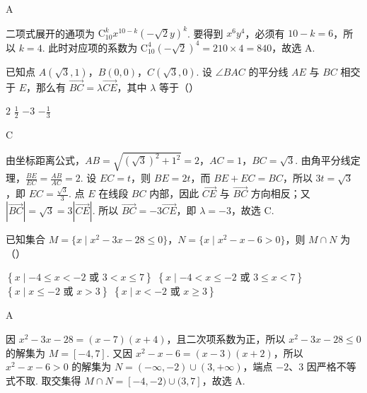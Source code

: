 \begin{answer}A\end{answer}

\begin{solution}
二项式展开的通项为 \(\mathrm C_{10}^{k}x^{10-k}\left(-\sqrt{2}y\right)^{k}\). 要得到 \(x^{6}y^{4}\)，必须有 \(10-k=6\)，所以 \(k=4\). 此时对应项的系数为 \(\mathrm C_{10}^{4}\left(-\sqrt{2}\right)^{4}=210\times4=840\)，故选 A.
\end{solution}

\begin{problem}
已知点 \(A(\sqrt{3}, 1)\)，\(B(0, 0)\)，\(C(\sqrt{3}, 0)\). 设 \(\angle BAC\) 的平分线 \(AE\) 与 \(BC\) 相交于 \(E\)，那么有 \(\overrightarrow{BC} = \lambda \overrightarrow{CE}\)，其中 \(\lambda\) 等于（\quad）

\choices
    {\(2\)}
    {\(\frac{1}{2}\)}
    {\(-3\)}
    {\(-\frac{1}{3}\)}
\end{problem}

\begin{answer}C\end{answer}

\begin{solution}
由坐标距离公式，\(AB=\sqrt{(\sqrt3)^{2}+1^{2}}=2\)，\(AC=1\)，\(BC=\sqrt3\). 由角平分线定理，\(\frac{BE}{EC}=\frac{AB}{AC}=2\). 设 \(EC=t\)，则 \(BE=2t\)，而 \(BE+EC=BC\)，所以 \(3t=\sqrt3\)，即 \(EC=\frac{\sqrt3}{3}\). 点 \(E\) 在线段 \(BC\) 内部，因此 \(\overrightarrow{CE}\) 与 \(\overrightarrow{BC}\) 方向相反；又 \(|\overrightarrow{BC}|=\sqrt3=3|\overrightarrow{CE}|\). 所以 \(\overrightarrow{BC}=-3\overrightarrow{CE}\)，即 \(\lambda=-3\)，故选 C.
\end{solution}

\begin{problem}
已知集合 \(M = \{x \mid x^2 - 3x - 28 \leqslant 0\}\)，\(N = \{x \mid x^2 - x - 6 > 0\}\)，则 \(M \cap N\) 为（\quad）

\choices
    {\(\left\{x\mid -4\leqslant x < -2\text{\ 或\ }3 < x\leqslant 7\right\}\)}
    {\(\left\{x\mid -4 < x\leqslant -2\text{\ 或\ }3\leqslant x < 7\right\}\)}
    {\(\left\{x\mid x\leqslant -2\text{\ 或\ }x > 3\right\}\)}
    {\(\left\{x\mid x < -2\text{\ 或\ }x\geqslant 3\right\}\)}
\end{problem}

\begin{answer}A\end{answer}

\begin{solution}
因 \(x^{2}-3x-28=(x-7)(x+4)\)，且二次项系数为正，所以 \(x^{2}-3x-28\leqslant0\) 的解集为 \(M=[-4,7]\). 又因 \(x^{2}-x-6=(x-3)(x+2)\)，所以 \(x^{2}-x-6>0\) 的解集为 \(N=(-\infty,-2)\cup(3,+\infty)\)，端点 \(-2\)、\(3\) 因严格不等式不取. 取交集得 \(M\cap N=[-4,-2)\cup(3,7]\)，故选 A.
\end{solution}

